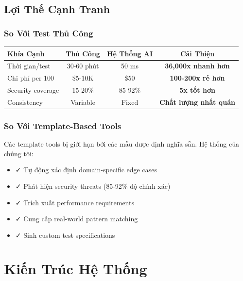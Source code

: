 \documentclass[12pt,oneside]{report}
\begin{document}
\section{Lợi Thế Cạnh Tranh}

\subsection{So Với Test Thủ Công}

\begin{table}[H]
\centering
\begin{tabular}{|l|c|c|c|}
\hline
\textbf{Khía Cạnh} & \textbf{Thủ Công} & \textbf{Hệ Thống AI} & \textbf{Cải Thiện} \\
\hline
Thời gian/test & 30-60 phút & 50 ms & \textbf{36,000x nhanh hơn} \\
Chi phí per 100 & \$5-10K & \$50 & \textbf{100-200x rẻ hơn} \\
Security coverage & 15-20\% & 85-92\% & \textbf{5x tốt hơn} \\
Consistency & Variable & Fixed & \textbf{Chất lượng nhất quán} \\
\hline
\end{tabular}
\end{table}

\subsection{So Với Template-Based Tools}

Các template tools bị giới hạn bởi các mẫu được định nghĩa sẵn. Hệ thống của chúng tôi:
\begin{itemize}
    \item ✓ Tự động xác định domain-specific edge cases
    \item ✓ Phát hiện security threats (85-92\% độ chính xác)
    \item ✓ Trích xuất performance requirements
    \item ✓ Cung cấp real-world pattern matching
    \item ✓ Sinh custom test specifications
\end{itemize}


\chapter{Kiến Trúc Hệ Thống}
\end{document}
